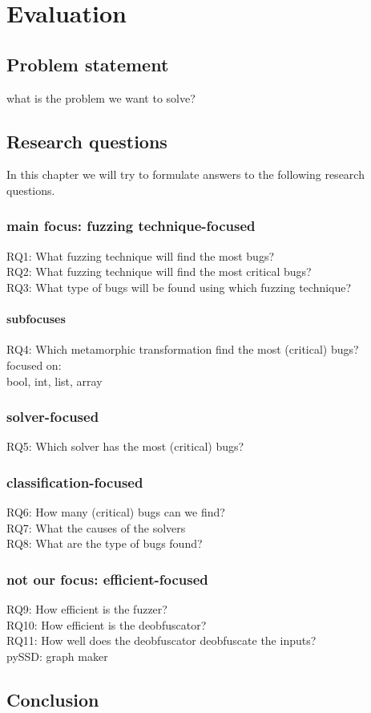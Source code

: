 \chapter{Evaluation}
\label{cha:eval}
\label{cha:intro}

\section{Problem statement}
what is the problem we want to solve?

\section{Research questions}
\label{eval:RQ}
In this chapter we will try to formulate answers to the following research questions.
\subsection{main focus: fuzzing technique-focused}
RQ1: What fuzzing technique will find the most bugs?\\
RQ2: What fuzzing technique will find the most critical bugs?\\
RQ3: What type of bugs will be found using which fuzzing technique?\\
\subsubsection{subfocuses}
RQ4: Which metamorphic transformation find the most (critical) bugs?\\
focused on: \\
bool, int, list, array
\subsection{solver-focused}
RQ5: Which solver has the most (critical) bugs?\\
\subsection{classification-focused}
RQ6: How many (critical) bugs can we find?\\
RQ7: What the causes of the solvers\\
RQ8: What are the type of bugs found?\\
\subsection{not our focus: efficient-focused} 
RQ9: How efficient is the fuzzer?\\
RQ10: How efficient is the deobfuscator?\\
RQ11: How well does the deobfuscator deobfuscate the inputs?\\

pySSD: graph maker

\section{Conclusion}
\label{eval:conclusion}

